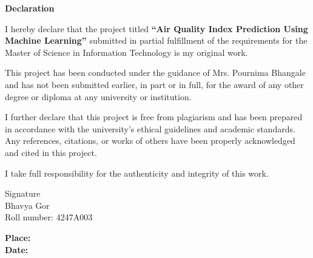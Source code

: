 \documentclass[12pt,a4paper]{report}
\begin{document}
\begin{center}
{\Large \textbf{Declaration}}
\end{center}

\vspace{1.5cm}

I hereby declare that the project titled \textbf{``Air Quality Index Prediction Using Machine Learning''} submitted in partial fulfillment of the requirements for the Master of Science in Information Technology is my original work.

\vspace{0.8cm}

This project has been conducted under the guidance of Mrs. Pournima Bhangale and has not been submitted earlier, in part or in full, for the award of any other degree or diploma at any university or institution.

\vspace{0.8cm}

I further declare that this project is free from plagiarism and has been prepared in accordance with the university's ethical guidelines and academic standards. Any references, citations, or works of others have been properly acknowledged and cited in this project.

\vspace{0.8cm}

I take full responsibility for the authenticity and integrity of this work.

\vspace{4cm}

\hfill
\begin{minipage}{0.4\textwidth}
\raggedleft
Signature\\
Bhavya Gor\\
Roll number: 4247A003
\end{minipage}

\vspace{3cm}

\noindent
\textbf{Place:}\\
\textbf{Date:}

\clearpage
\thispagestyle{empty}
\mbox{}

\clearpage
\thispagestyle{empty}
\end{document}
